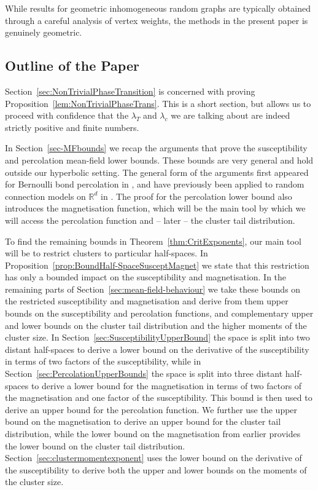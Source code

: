 \documentclass[10pt,a4paper,dvipsnames]{article}
\theoremstyle{definition}
\theoremstyle{remark}
\newcommand{\Rd}{\mathbb R^d}
\numberwithin{equation}{section}
\begin{document}
While results for geometric inhomogeneous random graphs are typically obtained through a careful analysis of vertex weights, the methods in the present paper is genuinely geometric.


\subsection{Outline of the Paper}
\label{sec:Outline}
Section~\ref{sec:NonTrivialPhaseTransition} is concerned with proving Proposition~\ref{lem:NonTrivialPhaseTrans}. This is a short section, but allows us to proceed with confidence that the $\lambda_T$ and $\lambda_c$ we are talking about are indeed strictly positive and finite numbers.

In Section~\ref{sec-MFbounds} we recap the arguments that prove the susceptibility and percolation mean-field lower bounds. These bounds are very general and hold outside our hyperbolic setting. The general form of the arguments first appeared for Bernoulli bond percolation in \cite{AizNew84,AizBar87}, and have previously been applied to random connection models on $\Rd$ in \cite{HeyHofLasMat19,caicedo2023critical}. The proof for the percolation lower bound also introduces the magnetisation function, which will be the main tool by which we will access the percolation function and -- later -- the cluster tail distribution.

To find the remaining bounds in Theorem~\ref{thm:CritExponents}, our main tool will be to restrict clusters to particular half-spaces.
In Proposition~\ref{prop:BoundHalf-SpaceSusceptMagnet} we state that this restriction has only a bounded impact on the susceptibility and magnetisation. 
In the remaining parts of Section~\ref{sec:mean-field-behaviour} we take these bounds on the restricted susceptibility and magnetisation and derive from them upper bounds on the susceptibility and percolation functions, and complementary upper and lower bounds on the cluster tail distribution and the higher moments of the cluster size. 
In Section~\ref{sec:SusceptibilityUpperBound} the space is split into two distant half-spaces to derive a lower bound on the derivative of the susceptibility in terms of two factors of the susceptibility, while in Section~\ref{sec:PercolationUpperBounds} the space is split into three distant half-spaces to derive a lower bound for the magnetisation in terms of two factors of the magnetisation and one factor of the susceptibility. This bound is then used to derive an upper bound for the percolation function. We further use the upper bound on the magnetisation to derive an upper bound for the cluster tail distribution, while the lower bound on the magnetisation from earlier provides the lower bound on the cluster tail distribution. Section~\ref{sec:clustermomentexponent} uses the lower bound on the derivative of the susceptibility to derive both the upper and lower bounds on the moments of the cluster size.
\end{document}
